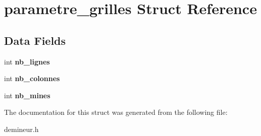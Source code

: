 \hypertarget{structparametre__grilles}{
\section{parametre\_\-grilles Struct Reference}
\label{structparametre__grilles}
}
\subsection*{Data Fields}
\begin{DoxyCompactItemize}
\item 
\hypertarget{structparametre__grilles_a07ebd3fcf6bb339077496fa00b10229e}{
int {\bfseries nb\_\-lignes}}
\label{structparametre__grilles_a07ebd3fcf6bb339077496fa00b10229e}

\item 
\hypertarget{structparametre__grilles_a5e9c499e503b9c6140d90ac6adba32c8}{
int {\bfseries nb\_\-colonnes}}
\label{structparametre__grilles_a5e9c499e503b9c6140d90ac6adba32c8}

\item 
\hypertarget{structparametre__grilles_ab6ae4bfd2587326fd986664c8c147b9f}{
int {\bfseries nb\_\-mines}}
\label{structparametre__grilles_ab6ae4bfd2587326fd986664c8c147b9f}

\end{DoxyCompactItemize}


The documentation for this struct was generated from the following file:\begin{DoxyCompactItemize}
\item 
demineur.h\end{DoxyCompactItemize}
